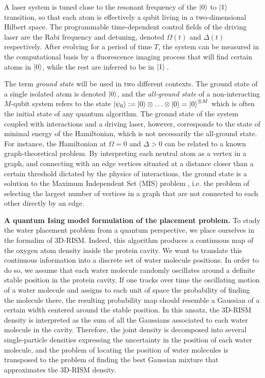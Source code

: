 \documentclass[fleqn,10pt]{wlscirep}
\begin{document}
A laser system is tuned close to the resonant frequency of the $\ket{0}$ to $\ket{1}$ transition, so that each atom is effectively a qubit living in a two-dimensional Hilbert space. The programmable time-dependent control fields of the driving laser are the Rabi frequency and detuning, denoted $\Omega(t)$ and $\Delta(t)$ respectively. After evolving for a period of time $T$, the system can be measured in the computational basis by a fluorescence imaging process that will find certain atoms in $\ket{0}$, while the rest are inferred to be in $\ket{1}$\,\cite{henriet2020quantum}.

The term \textit{ground state} will be used in two different contexts. The ground state of a single isolated atom is denoted $\ket{0}$, and the \textit{all-ground state} of a non-interacting $M$-qubit system refers to the state $\ket{\psi_0} := \ket{0} \otimes \ldots \otimes \ket{0} = \ket{0}^{\otimes M}$ which is often the initial state of any quantum algorithm. The ground state of the system coupled with interactions and a driving laser, however, corresponds to the state of minimal energy of the Hamiltonian, which is not necessarily the all-ground state. For instance, the Hamiltonian at $\Omega = 0$ and $\Delta > 0$ can be related to a known graph-theoretical problem. By interpreting each neutral atom as a vertex in a graph, and connecting with an edge vertices situated at a distance closer than a certain threshold dictated by the physics of interactions, the ground state is a solution to the Maximum Independent Set (MIS) problem \cite{max_indep_set_2009}, i.e. the problem of selecting the largest number of vertices in a graph that are not connected to each other directly by an edge.




\textbf{A quantum Ising model formulation of the placement problem.}\label{sec:distance-is-an-ising-model}
To study the water placement problem from a quantum perspective, we place ourselves in the formalim of 3D-RISM. Indeed, this algorithm produces a continuous map of the oxygen atom density inside the protein cavity. We want to translate this continuous information into a discrete set of water molecule positions. In order to do so, we assume that each water molecule randomly oscillates around a definite stable position in the protein cavity. If one tracks over time the oscillating motion of a water molecule and assigns to each unit of space the probability of finding the molecule there, the resulting probability map should resemble a Gaussian of a certain width centered around the stable position. In this ansatz, the 3D-RISM density is interpreted as the sum of all the Gaussians associated to each water molecule in the cavity. Therefore, the joint density is decomposed into several single-particle densities expressing the uncertainty in the position of each water molecule, and the problem of locating the position of water molecules is transposed to the problem of finding the best Gaussian mixture that approximates the 3D-RISM density.
\end{document}
